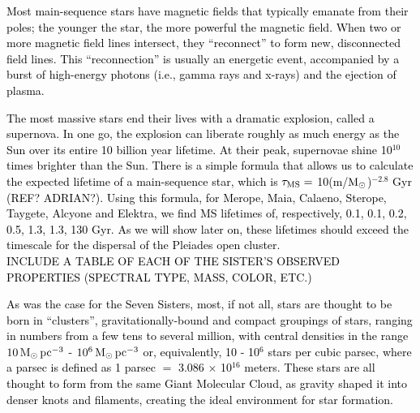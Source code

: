\documentclass[main.tex]{subfiles}
\begin{document}
\begin{tcolorbox}[sharp corners, colback=red!30, colframe=red!80!blue, title=Box \refstepcounter{educhap1}\label{boxchap1:rec}\ref{boxchap1:rec} -- Reconnection of Magnetic Field Lines]
\par \textcolor{black} {Most main-sequence stars have magnetic fields that typically emanate from their poles; the younger the star, the more powerful the magnetic field.  When two or more magnetic field lines intersect, they ``reconnect'' to form new, disconnected field lines.  This ``reconnection'' is usually an energetic event, accompanied by a burst of high-energy photons (i.e., gamma rays and x-rays) and the ejection of plasma.}   
\end{tcolorbox}

\begin{tcolorbox}[sharp corners, colback=blue!30, colframe=blue!80!blue, title=Box \refstepcounter{educhap1}\label{boxchap1:super}\ref{boxchap1:super} -- Supernovae and Stellar Lifetimes]
\par \textcolor{black} {The most massive stars end their lives with a dramatic explosion, called a supernova.  In one go, the explosion can liberate roughly as much energy as the Sun over its entire 10 billion year lifetime.  At their peak, supernovae shine 10$^{10}$ times brighter than the Sun.  There is a simple formula that allows us to calculate the expected lifetime of a main-sequence star, which is $\tau_{\rm MS} =$ 10(m/$\mathrm{M}_\odot$)$^{-2.8}$ Gyr (REF? ADRIAN?).  Using this formula, for Merope, Maia, Calaeno, Sterope, Taygete, Alcyone and Elektra, we find MS lifetimes of, respectively, 0.1, 0.1, 0.2, 0.5, 1.3, 1.3, 130 Gyr.  As we will show later on, these lifetimes should exceed the timescale for the dispersal of the Pleiades open cluster. \\
INCLUDE A TABLE OF EACH OF THE SISTER'S OBSERVED PROPERTIES (SPECTRAL TYPE, MASS, COLOR, ETC.)}
\end{tcolorbox}

\begin{tcolorbox}[sharp corners, colback=blue!30, colframe=blue!80!blue, title=Box \refstepcounter{educhap1}\label{boxchap1:starclus}\ref{boxchap1:starclus} -- Star Clusters]
\par \textcolor{black} {As was the case for the Seven Sisters, most, if not all, stars are thought to be born in ``clusters'', gravitationally-bound and compact groupings of stars, ranging in numbers from a few tens to several million, with central densities in the range $10\,\mathrm{M}_\odot\,\mathrm{pc}^{-3}$ - $10^6 \,\mathrm{M}_\odot \,\mathrm{pc}^{-3}$ or, equivalently, 10 - 10$^6$ stars per cubic parsec, where a parsec is defined as 1 parsec $=$ 3.086 $\times$ 10$^{16}$ meters.  These stars are all thought to form from the same Giant Molecular Cloud, as gravity shaped it into denser knots and filaments, creating the ideal environment for star formation.}  
\end{tcolorbox} 
\end{document}
